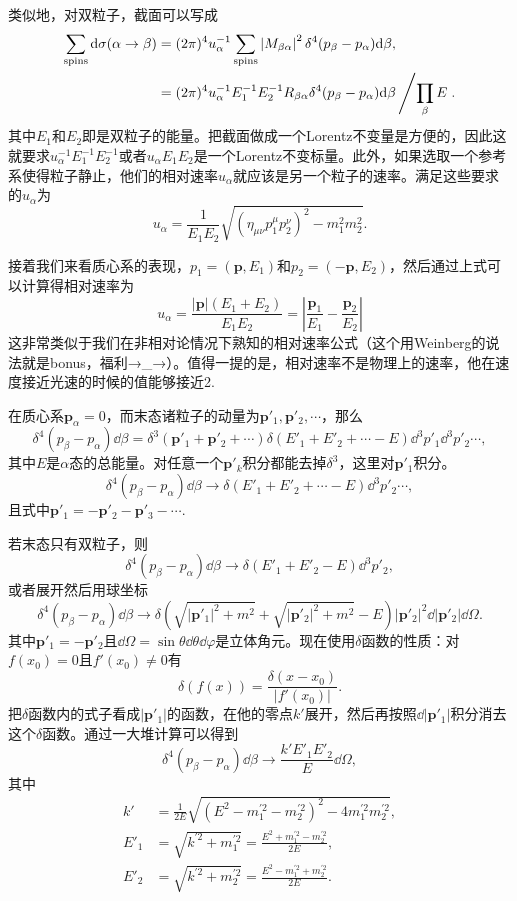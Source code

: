 \documentclass[9pt]{extbook}
\begin{document}
类似地，对双粒子，截面可以写成
\[
	\begin{split}
	\sum_{\text{spins}}\mathrm{d} \sigma (\alpha\to\beta)&=(2\pi)^{4}u_\alpha^{-1}\sum_{\text{spins}}\left|M_{\beta\alpha}\right|^2\delta^4(p_\beta-p_\alpha)\mathrm{d} \beta,\\
	&=(2\pi)^{4}u_\alpha^{-1}E^{-1}_{1}E^{-1}_{2}R_{\beta\alpha}\delta^4(p_\beta-p_\alpha)\mathrm{d} \beta\left/\prod_\beta E\right..
	\end{split}
\]
其中$E_{1}$和$E_{2}$即是双粒子的能量。把截面做成一个Lorentz不变量是方便的，因此这就要求$u_\alpha^{-1}E^{-1}_{1}E^{-1}_{2}$或者$u_\alpha E_{1}E_{2}$是一个Lorentz不变标量。此外，如果选取一个参考系使得粒子静止，他们的相对速率$u_\alpha$就应该是另一个粒子的速率。满足这些要求的$u_\alpha$为
\[
	u_\alpha=\frac{1}{E_{1}E_{2}} \sqrt{\left(\eta_{\mu\nu}p_1^\mu p_2^\nu\right)^2-m_1^2 m_2^2}.
\]

接着我们来看质心系的表现，$p_1=(\bm{p},E_1)$和$p_2=(-\bm{p},E_2)$，然后通过上式可以计算得相对速率为
\[
	u_\alpha=\frac{|\bm{p}|(E_1+E_2)}{E_1 E_2}=\left|\frac{\bm{p}_1}{E_1}-\frac{\bm{p}_2}{E_2}\right|
\]
这非常类似于我们在非相对论情况下熟知的相对速率公式（这个用Weinberg的说法就是bonus，福利→\_→）。值得一提的是，相对速率不是物理上的速率，他在速度接近光速的时候的值能够接近2.

在质心系$\bm{p}_\alpha=0$，而末态诸粒子的动量为$\bm{p}'_1,\bm{p}'_2,\cdots$，那么
\[
	\delta^4(p_\beta-p_\alpha)\dd \beta=\delta^3(\bm{p}'_1+\bm{p}'_2+\cdots)\delta(E'_1+E'_2+\cdots-E)\dd^3 p'_1 \dd^3 p'_2\cdots,
\]
其中$E$是$\alpha$态的总能量。对任意一个$\bm{p}'_k$积分都能去掉$\delta^3$，这里对$\bm{p}'_1$积分。
\[
	\delta^4(p_\beta-p_\alpha)\dd \beta \to\delta(E'_1+E'_2+\cdots-E)\dd^3 p'_2\cdots,
\]
且式中$\bm{p}'_1=-\bm{p}'_2-\bm{p}'_3-\cdots$.

若末态只有双粒子，则
\[
	\delta^4(p_\beta-p_\alpha)\dd \beta \to\delta(E'_1+E'_2-E)\dd^3 p'_2,
\]
或者展开然后用球坐标
\[
	\delta^4(p_\beta-p_\alpha)\dd \beta \to\delta\left(\sqrt{|\bm{p}'_1|^2+m^2}+\sqrt{|\bm{p}'_2|^2+m^2}-E\right)|\bm{p}'_2|^2 \dd |\bm{p}'_2| \dd \Omega.
\]
其中$\bm{p}'_1=-\bm{p}'_2$且$\dd \Omega=\sin\theta\dd\theta\dd\varphi$是立体角元。现在使用$\delta$函数的性质：对$f(x_0)=0$且$f'(x_0)\neq 0$有
\[
	\delta\left(f(x)\right)=\frac{\delta(x-x_0)}{|f'(x_0)|}.
\]
把$\delta$函数内的式子看成$|\bm{p}'_1|$的函数，在他的零点$k'$展开，然后再按照$\dd |\bm{p}'_1|$积分消去这个$\delta$函数。通过一大堆计算可以得到
\[
	\delta^4(p_\beta-p_\alpha)\dd \beta \to \frac{k'E'_1 E'_2}{E}\dd \Omega,
\]
其中
\[
	\begin{split}
		k'&=\frac{1}{2E}\sqrt{(E^2-m^{\prime 2}_1-m^{\prime 2}_2)^2-4m^{\prime 2}_1 m^{\prime 2}_2},\\
		E'_1&=\sqrt{k^{\prime 2}+m^{\prime 2}_1}=\frac{E^2+m^{\prime 2}_1-m^{\prime 2}_2}{2E},\\
		E'_2&=\sqrt{k^{\prime 2}+m^{\prime 2}_2}=\frac{E^2-m^{\prime 2}_1+m^{\prime 2}_2}{2E}.
	\end{split}
\]
\end{document}
